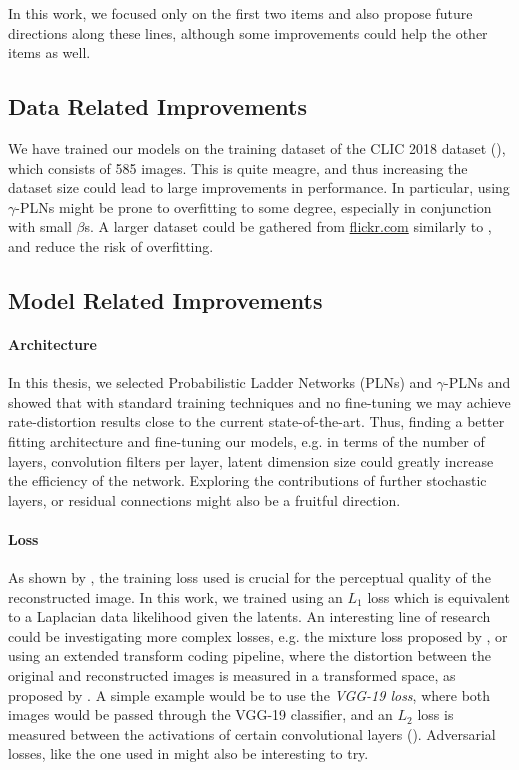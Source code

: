 In this work, we focused only on the first two items and also propose future
directions along these lines, although some improvements could help the other
items as well.

\subsection{Data Related Improvements}
\par
We have trained our models on the training dataset of the CLIC 2018 dataset
(\cite{clic2018}), which consists of 585 images. This is quite meagre, and thus
increasing the dataset size could lead to large improvements in performance. In
particular, using $\gamma$-PLNs might be prone to overfitting to some degree,
especially in conjunction with small $\beta$s. A larger dataset could be
gathered from \url{flickr.com} similarly to \cite{theis2017lossy}, and reduce
the risk of overfitting.

\subsection{Model Related Improvements}
\paragraph{Architecture}
In this thesis, we selected Probabilistic Ladder Networks (PLNs) and
$\gamma$-PLNs and showed that with standard training techniques and no
fine-tuning we may achieve rate-distortion results close to the current
state-of-the-art. Thus, finding a better fitting architecture and fine-tuning
our models, e.g. in terms of the number of layers, convolution filters per layer,
latent dimension size could greatly increase the efficiency of the network.
Exploring the contributions of further stochastic layers, or residual
connections might also be a fruitful direction.

\paragraph{Loss}
As shown by \cite{zhao2015loss}, the training loss used is crucial for the
perceptual quality of the reconstructed image. In this work, we trained using an
$L_1$ loss which is equivalent to a Laplacian data likelihood given the latents.
An interesting line of research could be investigating more complex losses, e.g.
the mixture loss proposed by \cite{zhao2015loss}, or using an extended transform
coding pipeline, where the distortion between the original and reconstructed
images is measured in a transformed space, as proposed by \cite{balle2016end}.
A simple example would be to use the \textit{VGG-19 loss}, where
both images would be passed through the VGG-19 classifier, and an $L_2$ loss is
measured between the activations of certain convolutional layers
(\cite{johnson2016perceptual}). Adversarial losses, like the one used in
\cite{rippel2017real} might also be interesting to try.

